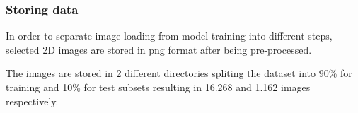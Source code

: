 \newpage

\subsubsection*{Storing data}

In order to separate image loading from model training into different steps, selected 2D images are stored in \acrshort{png} format after being pre-processed. 

The images are stored in 2 different directories spliting the dataset into 90\% for training and 10\% for test subsets resulting in 16.268 and 1.162 images respectively.